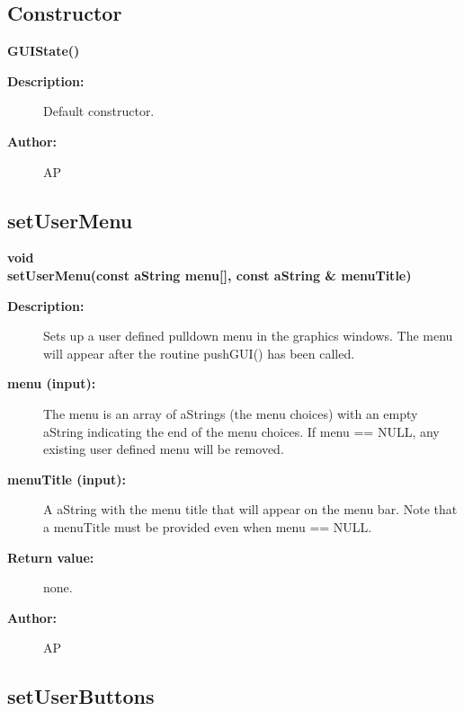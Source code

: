 \subsection{Constructor}
 
\newlength{\GUIStateIncludeArgIndent}
\begin{flushleft} \textbf{%
\settowidth{\GUIStateIncludeArgIndent}{GUIState(}%
GUIState()
}\end{flushleft}
\begin{description}
\item[{\bf Description:}]  Default constructor.
\item[{\bf Author:}]  AP
\end{description}
\subsection{setUserMenu}
 
\begin{flushleft} \textbf{%
void  \\ 
\settowidth{\GUIStateIncludeArgIndent}{setUserMenu(}%
setUserMenu(const aString menu[], const aString \& menuTitle)
}\end{flushleft}
\begin{description}
\item[{\bf Description:}] 
    Sets up a user defined pulldown menu in the graphics windows. The menu will
    appear after the routine pushGUI() has been called.
\item[{\bf menu (input):}] 
    The {\ff menu} is
    an array of aStrings (the menu choices) with an empty aString
    indicating the end of the menu choices. If menu == NULL, any existing user defined 
    menu will be removed.
\item[{\bf menuTitle (input):}]  A aString with the menu title that will appear on the menu bar. Note 
    that a menuTitle must be provided even when menu == NULL.
\item[{\bf Return value:}]  none.
\item[{\bf Author:}]  AP
\end{description}
\subsection{setUserButtons}
 
